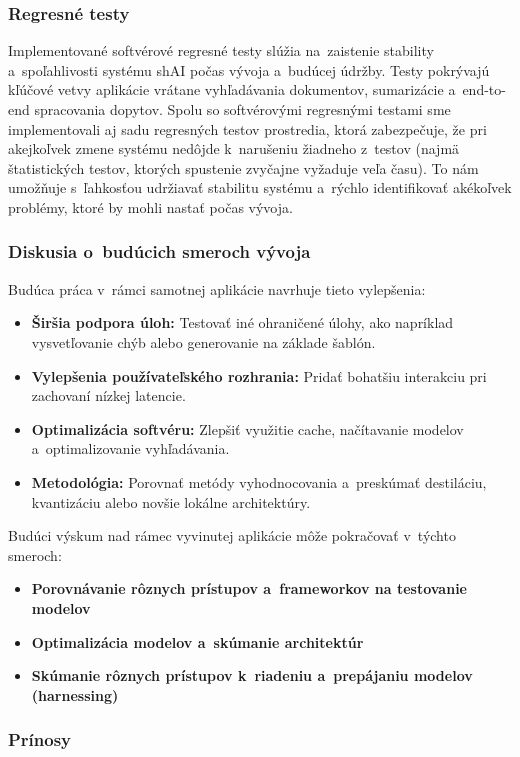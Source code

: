 \subsubsection*{Regresné testy}
Implementované softvérové regresné testy slúžia na~zaistenie stability a~spoľahlivosti systému shAI počas vývoja a~budúcej údržby. Testy pokrývajú kľúčové vetvy aplikácie vrátane vyhľadávania dokumentov, sumarizácie a~end-to-end spracovania dopytov. Spolu so softvérovými regresnými testami sme implementovali aj sadu regresných testov prostredia, ktorá zabezpečuje, že pri akejkoľvek zmene systému nedôjde k~narušeniu žiadneho z~testov (najmä štatistických testov, ktorých spustenie zvyčajne vyžaduje veľa času). To nám umožňuje s~ľahkosťou udržiavať stabilitu systému a~rýchlo identifikovať akékoľvek problémy, ktoré by mohli nastať počas vývoja.

\subsubsection*{Diskusia o~budúcich smeroch vývoja}

Budúca práca v~rámci samotnej aplikácie navrhuje tieto vylepšenia:
\begin{itemize}
    \item \textbf{Širšia podpora úloh:} Testovať iné ohraničené úlohy, ako napríklad vysvetľovanie chýb alebo generovanie na základe šablón.
    \item \textbf{Vylepšenia používateľského rozhrania:} Pridať bohatšiu interakciu pri zachovaní nízkej latencie.
    \item \textbf{Optimalizácia softvéru:} Zlepšiť využitie cache, načítavanie modelov a~optimalizovanie vyhľadávania.
    \item \textbf{Metodológia:} Porovnať metódy vyhodnocovania a~preskúmať destiláciu, kvantizáciu alebo novšie lokálne architektúry.
\end{itemize}
Budúci výskum nad rámec vyvinutej aplikácie môže pokračovať v~týchto smeroch:
\begin{itemize}
    \item \textbf{Porovnávanie rôznych prístupov a~frameworkov na testovanie modelov}
    \item \textbf{Optimalizácia modelov a~skúmanie architektúr}
    \item \textbf{Skúmanie rôznych prístupov k~riadeniu a~prepájaniu modelov (harnessing)}
\end{itemize}

\subsubsection*{Prínosy}

